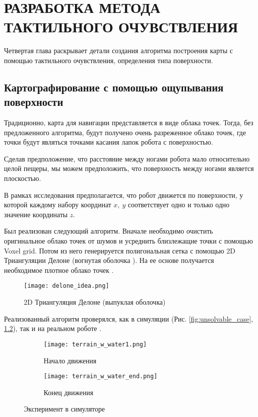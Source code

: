 \chapter{РАЗРАБОТКА МЕТОДА ТАКТИЛЬНОГО ОЧУВСТВЛЕНИЯ}\label{ch:ch4}


Четвертая глава раскрывает детали создания алгоритма построения карты с помощью тактильного очувствления, определения типа поверхности.

\section{Картографирование с помощью ощупывания поверхности}
Традиционно, карта для навигации представляется в виде облака точек. Тогда, без предложенного алгоритма, будут получено очень разреженное облако точек, где точки будут являться точками касания лапок робота с поверхностью.

Сделав предположение, что расстояние между ногами робота мало относительно целой пещеры, мы можем предположить, что поверхность между ногами является плоскостью.


В рамках исследования предполагается, что робот движется по поверхности, у которой каждому набору координат $x,\ y$ соответствует одно и только одно значение координаты $z$.

Был реализован следующий алгоритм. Вначале необходимо очистить оригинальное облако точек от шумов и усреднить близлежащие точки с помощью Voxel grid. Потом из него генерируется полигональная сетка с помощью 2D Триангуляции Делоне  (вогнутая оболочка ). На ее основе получается необходимое плотное облако точек . 

\begin{figure}[H]
    \centering\texttt{[image: delone\_idea.png]}
    \caption{2D Триангуляция Делоне (выпуклая оболочка)}
    \label{fig:delone_idea.png}
\end{figure}

Реализованный алгоритм проверялся, как в симуляции (Рис. \ref{fig:unsolvable_case}, \ref{fig:start_end_exp}), так и на реальном роботе .


\begin{figure}[H]
    \begin{subfigure}[t]{0.49\textwidth}
        \centering\texttt{[image: terrain\_w\_water1.png]}
        \caption{Начало движения}
    \end{subfigure}
    \begin{subfigure}[t]{0.49\textwidth}
        \centering\texttt{[image: terrain\_w\_water\_end.png]}
        \caption{Конец движения}
    \end{subfigure}
    \caption{Эксперимент в симуляторе}
    \label{fig:start_end_exp}
\end{figure}

